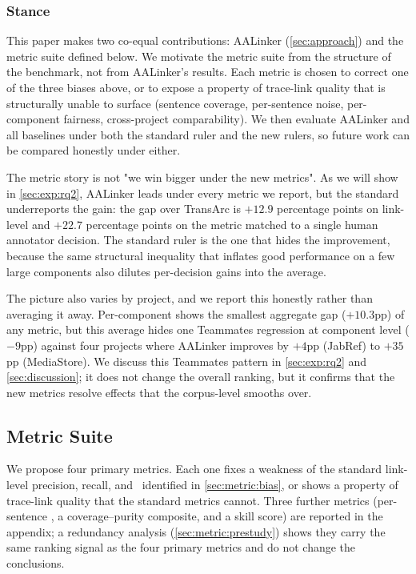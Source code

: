 \subsubsection*{Stance}
This paper makes two co-equal contributions: AALinker (\autoref{sec:approach}) and the metric suite defined below.
We motivate the metric suite from the structure of the benchmark, not from AALinker's results.
Each metric is chosen to correct one of the three biases above, or to expose a property of trace-link quality that \fone is structurally unable to surface (sentence coverage, per-sentence noise, per-component fairness, cross-project comparability).
We then evaluate AALinker and all baselines under both the standard ruler and the new rulers, so future work can be compared honestly under either.

The metric story is not "we win bigger under the new metrics".
As we will show in \autoref{sec:exp:rq2}, AALinker leads under every metric we report, but the standard \fone underreports the gain: the gap over TransArc is $+12.9$ percentage points on link-level \fone and $+22.7$ percentage points on the metric matched to a single human annotator decision.
The standard ruler is the one that hides the improvement, because the same structural inequality that inflates good performance on a few large components also dilutes per-decision gains into the average.

The picture also varies by project, and we report this honestly rather than averaging it away.
Per-component \fone shows the smallest aggregate gap ($+10.3$pp) of any metric, but this average hides one Teammates regression at component level ($-9$pp) against four projects where AALinker improves by $+4$pp (JabRef) to $+35$pp (MediaStore).
We discuss this Teammates pattern in \autoref{sec:exp:rq2} and \autoref{sec:discussion}; it does not change the overall ranking, but it confirms that the new metrics resolve effects that the corpus-level \fone smooths over.


\subsection{Metric Suite}
\label{sec:metric:suite}

We propose four primary metrics.
Each one fixes a weakness of the standard link-level precision, recall, and \fone\ identified in \autoref{sec:metric:bias}, or shows a property of trace-link quality that the standard metrics cannot.
Three further metrics (per-sentence \fone, a coverage--purity composite, and a skill score) are reported in the appendix; a redundancy analysis (\autoref{sec:metric:prestudy}) shows they carry the same ranking signal as the four primary metrics and do not change the conclusions.


